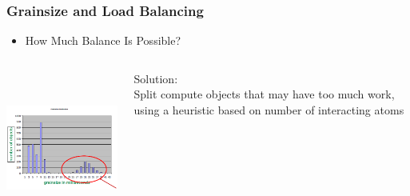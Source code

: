 \begin{frame}[fragile]
\frametitle{Grainsize and Load Balancing}
\begin{itemize}
\item[] How Much Balance Is Possible?
\end{itemize}
\begin{columns}
  \begin{column}[T]{2.8in}
  \includegraphics[width=2.8in, height=2.0in]{figures/histogramGrains}
  \end{column}

  \begin{column}[T]{5cm}
  Solution:\\ 
  Split compute objects that may have too much work,
  using a heuristic based on number of interacting atoms
  \end{column}
\end{columns}
\end{frame}

